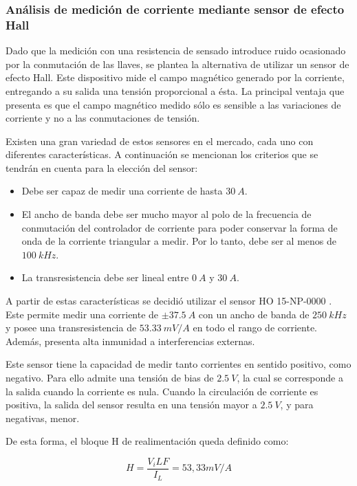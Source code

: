\subsubsection{Análisis de medición de corriente mediante sensor de efecto Hall}

Dado que la medición con una resistencia de sensado introduce ruido ocasionado por la conmutación de las llaves, se plantea la alternativa de utilizar un sensor de efecto Hall. Este dispositivo mide el campo magnético generado por la corriente, entregando a su salida una tensión proporcional a ésta. La principal ventaja que presenta es que el campo magnético medido sólo es sensible a las variaciones de corriente y no a las conmutaciones de tensión.

Existen una gran variedad de estos sensores en el mercado, cada uno con diferentes características. A continuación se mencionan los criterios que se tendrán en cuenta para la elección del sensor:

\begin{itemize}
	\item Debe ser capaz de medir una corriente de hasta $30\:A$.
	\item El ancho de banda debe ser mucho mayor al polo de la frecuencia de conmutación del controlador de corriente para poder conservar la forma de onda de la corriente triangular a medir. Por lo tanto, debe ser al menos de $100\:kHz$.
	\item La transresistencia debe ser lineal entre $0\:A$ y $30\:A$.	
\end{itemize}

A partir de estas características se decidió utilizar el sensor HO 15-NP-0000 \cite{HO15-NP}. Este permite medir una corriente de $\pm 37.5\:A$ con un ancho de banda de $250\:kHz$ y posee una transresistencia de $53.33\:mV/A$ en todo  el rango de corriente. Además, presenta alta inmunidad a interferencias externas. 

Este sensor tiene la capacidad de medir tanto corrientes en sentido positivo, como negativo. Para ello admite una tensión de bias de $2.5\:V$, la cual se corresponde a la salida cuando la corriente es nula. Cuando la circulación de corriente es positiva, la salida del sensor resulta en una tensión mayor a $2.5\:V$, y para negativas, menor.

De esta forma, el bloque H de realimentación queda definido como:

\begin{equation}
	H=\frac{V_iLF}{I_L}=53,33 mV/A
\end{equation}



